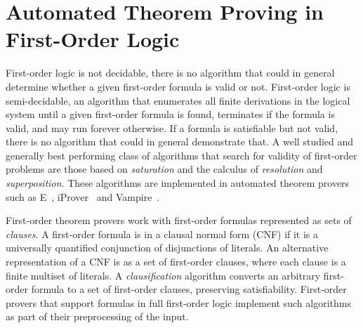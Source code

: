 

\section*{Automated Theorem Proving in First-Order Logic}

First-order logic is not decidable, there is no algorithm that could in general determine whether a given first-order formula is valid or not. First-order logic is semi-decidable, an algorithm that enumerates all finite derivations in the logical system until a given first-order formula is found, terminates if the formula is valid, and may run forever otherwise. If a formula is satisfiable but not valid, there is no algorithm that could in general demonstrate that. A well studied and generally best performing class of algorithms that search for validity of first-order problems are those based on \emph{saturation} and the calculus of \emph{resolution} and \emph{superposition}. These algorithms are implemented in automated theorem provers such as E~\cite{E13}, iProver~\cite{iProver} and Vampire~\cite{Vampire13}.

First-order theorem provers work with first-order formulas represented as sets of \emph{clauses}. A first-order formula is in a clausal normal form (CNF) if it is a universally quantified conjunction of disjunctions of literals. An alternative representation of a CNF is as a set of first-order clauses, where each clause is a finite multiset of literals. A \emph{clausification} algorithm converts an arbitrary first-order formula to a set of first-order clauses, preserving satisfiability. First-order provers that support formulas in full first-order logic implement such algorithms as part of their preprocessing of the input.

